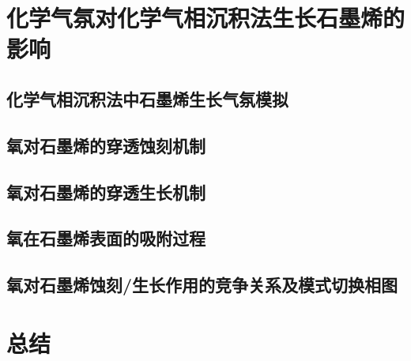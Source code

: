 \section{化学气氛对化学气相沉积法生长石墨烯的影响}
\label{sec:石墨烯氧蚀刻穿透}
    \subsection{化学气相沉积法中石墨烯生长气氛模拟}
    \subsection{氧对石墨烯的穿透蚀刻机制}
    \subsection{氧对石墨烯的穿透生长机制}
    \subsection{氧在石墨烯表面的吸附过程}
    \subsection{氧对石墨烯蚀刻/生长作用的竞争关系及模式切换相图}
\section{总结}

